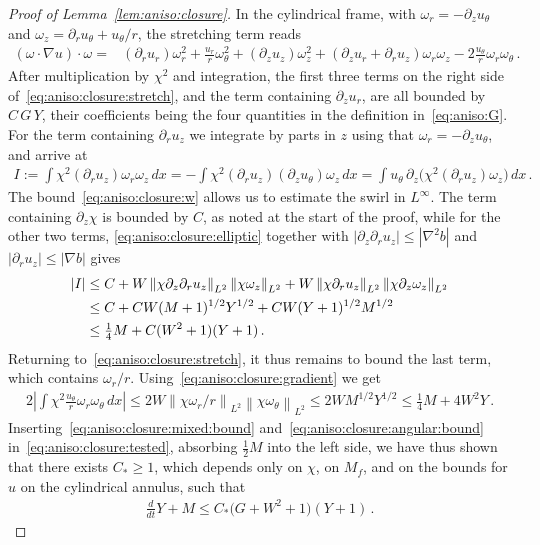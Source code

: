 \documentclass[11pt,reqno]{amsproc}
\numberwithin{equation}{section}
\theoremstyle{remark}
\newcommand{\p}{\partial}
\newcommand{\norm}[1]{\left\|#1\right\|}
\begin{document}
\begin{proof}[Proof of Lemma~\ref{lem:aniso:closure}]
In the cylindrical frame, with $\omega_r=-\p_zu_\theta$ and $\omega_z=\p_ru_\theta+u_\theta/r$, the stretching term reads
\begin{align}
(\omega\cdot\nabla u)\cdot\omega
={}&(\p_r u_r)\omega_r^2
+\frac{u_r}{r}\omega_\theta^2
+(\p_z u_z)\omega_z^2
+(\p_z u_r+\p_r u_z)\omega_r\omega_z
-2\frac{u_\theta}{r}\omega_r\omega_\theta
\,.
\label{eq:aniso:closure:stretch}
\end{align}
After multiplication by $\chi^2$ and integration, the first three terms on the right side of~\eqref{eq:aniso:closure:stretch}, and the term containing $\p_zu_r$, are all bounded by $C\, G\, Y$, their coefficients being the four quantities in the definition in~\eqref{eq:aniso:G}. For the term containing $\p_ru_z$ we integrate by parts in $z$ using that $\omega_r=-\p_zu_\theta$, and arrive at 
\begin{align}
I:=\int\chi^2(\p_r u_z)\omega_r\omega_z\,dx
=-\int\chi^2(\p_r u_z)(\p_zu_\theta)\omega_z\,dx
=\int u_\theta\,\p_z\bigl(\chi^2(\p_r u_z)\omega_z\bigr)\,dx
\,.
\label{eq:aniso:closure:mixed}
\end{align}
The bound~\eqref{eq:aniso:closure:w} allows us to estimate the swirl in $L^\infty$. The term containing $\p_z\chi$ is bounded by $C$, as noted at the start of the proof, while for the other two terms, \eqref{eq:aniso:closure:elliptic} together with $|\p_z\p_r u_z|\le|\nabla^2b|$ and $|\p_r u_z|\le|\nabla b|$ gives
\begin{align}
|I|
&\le C+W\norm{\chi\p_z\p_r u_z}_{L^2}\norm{\chi\omega_z}_{L^2}
+W\norm{\chi\p_r u_z}_{L^2}\norm{\chi\p_z\omega_z}_{L^2}
\notag\\
&\le C+CW(M+1)^{1/2}Y^{1/2}
+CW(Y+1)^{1/2}M^{1/2}
\notag\\
&\le\tfrac14M+C(W^2+1)(Y+1)
\,.
\label{eq:aniso:closure:mixed:bound}
\end{align}
Returning to~\eqref{eq:aniso:closure:stretch}, it thus remains to bound the last term, which contains $\omega_r/r$. Using~\eqref{eq:aniso:closure:gradient} we get
\begin{align}
2\left|\int\chi^2\frac{u_\theta}{r}\omega_r\omega_\theta\,dx\right|
\le2W\norm{\chi\omega_r/r}_{L^2}\norm{\chi\omega_\theta}_{L^2}
\le2W M^{1/2}Y^{1/2}
\le\tfrac14M+4W^2Y
\,.
\label{eq:aniso:closure:angular:bound}
\end{align}
Inserting~\eqref{eq:aniso:closure:mixed:bound} and~\eqref{eq:aniso:closure:angular:bound} in~\eqref{eq:aniso:closure:tested}, absorbing $\frac12M$ into the left side, we have thus shown that there exists $C_*\ge1$, which depends only on $\chi$, on $M_f$, and on the bounds for $u$ on the cylindrical annulus, such that
\begin{align}
\frac{d}{dt} Y+M\le C_*\bigl(G+W^2+1\bigr)(Y+1)
\,.
\label{eq:aniso:closure:energy}
\end{align}


\end{proof}
\end{document}
